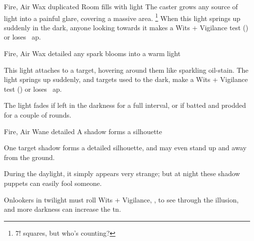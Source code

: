   {Fire, Air}%
  {Wax}%
  {duplicated}%
  {}%
  {Room fills with light}%
  {
    The caster grows any source of light into a painful glare, covering a massive area.%
    \footnote{$7!$ squares, but who's counting?}
    When this light springs up suddenly in the dark, anyone looking towards it makes a Wits + Vigilance test (\tn[9]) or loses ~\gls{ap}.
  }

  {Fire, Air}%
  {Wax}%
  {detailed}%
  {}%
  {any spark blooms into a warm light}%
  {
    This light attaches to a target, hovering around them like sparkling oil-stain.
    The light springs up suddenly, and targets used to the dark, make a Wits + Vigilance test (\tn[9]) or loses ~\gls{ap}.

    The light fades if left in the darkness for a full \gls{interval}, or if batted and prodded for a couple of rounds.
  }

  {Fire, Air}%
  {Wane}%
  {detailed}%
  {}%
  {A shadow forms a silhouette}%
  {
    One target shadow forms a detailed silhouette, and may even stand up and away from the ground.

    During the daylight, it simply appears very strange; but at night these shadow puppets can easily fool someone.

    \setcounter{track}{\value{spelllevel}}
    \addtocounter{track}{7}
    Onlookers in twilight must roll Wits + Vigilance, , to see through the illusion, and more darkness can increase the \gls{tn}.
  }

